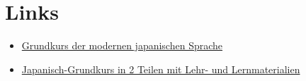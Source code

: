 \documentclass[justified, a4paper, notitlepage, captions=tableheading, nobib]{tufte-handout}
\begin{document}
\newpage
\section{Links}
\label{sec:org6ad1c77}

\begin{itemize}
\item \href{https://www-user.tu-chemnitz.de/\~heha/j/buchtext/Index.htm}{Grundkurs der modernen japanischen Sprache}
\item \href{https://omp.ub.rub.de/index.php/RUB/catalog/book/31}{Japanisch-Grundkurs in 2 Teilen mit Lehr- und Lernmaterialien}
\end{itemize}

\newpage

\nocite{*}
\printbibliography
{}
\end{document}
